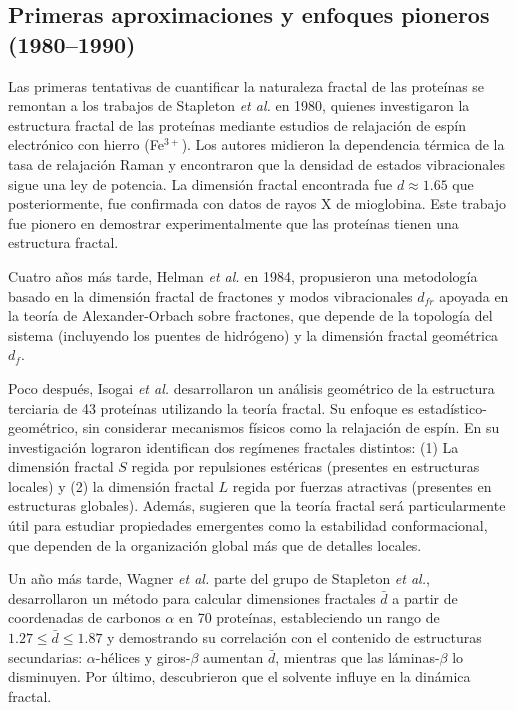 \subsection{Primeras aproximaciones y enfoques pioneros (1980--1990)}

Las primeras tentativas de cuantificar la naturaleza fractal de las prote\'{i}nas se remontan a los trabajos de Stapleton \textit{et al.}\cite{Stapleton1980} en 1980, quienes investigaron la estructura fractal de las prote\'{i}nas mediante estudios de relajaci\'{o}n de esp\'{i}n electr\'{o}nico con hierro (Fe$^{3+}$). Los autores midieron la dependencia t\'{e}rmica de la tasa de relajaci\'{o}n Raman y encontraron que la densidad de estados vibracionales sigue una ley de potencia. La dimensi\'{o}n fractal encontrada fue $d \approx 1.65$ que posteriormente, fue confirmada con datos de rayos X de mioglobina. Este trabajo fue pionero en demostrar experimentalmente que las prote\'{i}nas tienen una estructura fractal. 

Cuatro años m\'{a}s tarde, Helman \textit{et al.}\cite{Helman1984} en 1984, propusieron una metodolog\'{i}a basado en la dimensi\'{o}n fractal de fractones y modos vibracionales $d_{fr}$ apoyada en la teor\'{i}a de Alexander-Orbach \cite{Alexander1982} sobre fractones, que depende de la topolog\'{i}a del sistema (incluyendo los puentes de hidr\'{o}geno) y la dimensi\'{o}n fractal geom\'{e}trica $d_f$.

Poco despu\'{e}s, Isogai \textit{et al.} \cite{Isogai1984} desarrollaron un an\'{a}lisis geom\'{e}trico de la estructura terciaria de 43 prote\'{i}nas utilizando la teor\'{i}a fractal. Su enfoque es estad\'{i}stico-geom\'{e}trico, sin considerar mecanismos f\'{i}sicos como la relajaci\'{o}n de esp\'{i}n.
En su investigaci\'{o}n lograron identifican dos reg\'{i}menes fractales distintos: (1) La dimensi\'{o}n fractal $S$ regida por repulsiones est\'{e}ricas (presentes en estructuras locales) y (2) la dimensi\'{o}n fractal $L$ regida por fuerzas atractivas (presentes en estructuras globales). Adem\'{a}s, sugieren que la teor\'{i}a fractal ser\'{a} particularmente \'{u}til para estudiar propiedades emergentes como la estabilidad conformacional, que dependen de la organizaci\'{o}n global m\'{a}s que de detalles locales.

Un año m\'{a}s tarde, Wagner \textit{et al.} \cite{Wagner1985} parte  del grupo de Stapleton \textit{et al.}, desarrollaron un m\'{e}todo para calcular dimensiones fractales $\bar{d}$ a partir de coordenadas de carbonos $\alpha$ en 70 prote\'{i}nas, estableciendo un rango de $1.27 \leq \bar{d} \leq 1.87$ y demostrando su correlaci\'{o}n con el contenido de estructuras secundarias: $\alpha$-h\'{e}lices y giros-$\beta$ aumentan $\bar{d}$, mientras que las l\'{a}minas-$\beta$ lo disminuyen. Por \'{u}ltimo, descubrieron que el solvente influye en la din\'{a}mica fractal.

